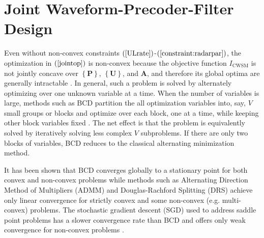 \documentclass[9pt,journal]{IEEEtran}
\newcommand{\paren}[1]{\left({#1}\right)}
\newcommand{\braces}[1]{{\left\{ {#1}\right\}}}
\theoremstyle{definition}
\begin{document}
\section{Joint Waveform-Precoder-Filter Design}
\label{sec:solution}
Even without non-convex constraints $\paren{\mathrm{\ref{ULrate}}}$-$\paren{\mathrm{\ref{constraint:radarpar}}}$, the optimization in $\paren{\mathrm{\ref{jointop}}}$ is non-convex because the objective function $\mathit{I}_{\textrm{CWSM}}$ is not jointly concave over ${\braces{\mathbf{P}}}$, $\braces{\mathbf{U}}$, and $\mathbf{A}$, and therefore its global optima are generally intractable \cite{Lui2006subg}. In general, such a problem is solved by alternately optimizing over one unknown variable at a time. When the number of variables is large, methods such as BCD partition the all optimization variables into, say, $V$ small groups or blocks and optimize over each block, one at a time, while keeping other block variables fixed \cite{BCDconvergence}. The net effect is that the problem is equivalently solved by iteratively solving less complex $V$ subproblems. %
If there are only two blocks of variables, BCD reduces to the classical alternating minimization method\cite{BCDconvergence,Liu2017asilomar}.  %

It has been shown \cite{ADMMBCD,zhang2017convergent} that BCD converges globally to a stationary point for both convex and non-convex problems while methods such as Alternating Direction Method of Multipliers (ADMM) and Douglas-Rachford Splitting (DRS) achieve only linear convergence for strictly convex and some non-convex (e.g. multi-convex) problems. The stochastic gradient descent (SGD) used to address saddle point problems has a slower convergence rate than BCD and offers only weak convergence for non-convex problems \cite{zhang2017convergent}. 
\end{document}
